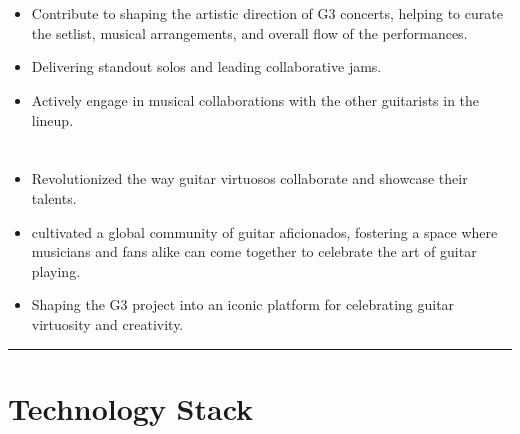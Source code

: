 \documentclass[12pt]{../templates/classes/res}
\begin{document}
\begin{resume}
\begin{multicols}{2}
  \section{}
    \begin{itemize}
      \item Contribute to shaping the artistic direction of G3 concerts, helping to curate the setlist, musical arrangements, and overall flow of the performances. 
\item Delivering standout solos and leading collaborative jams.
\item Actively engage in musical collaborations with the other guitarists in the lineup.
    \end{itemize}
  \section{}
    \begin{itemize}
      \setlength{\itemindent}{0pt}
      \item Revolutionized the way guitar virtuosos collaborate and showcase their talents.
\item cultivated a global community of guitar aficionados, fostering a space where musicians and fans alike can come together to celebrate the art of guitar playing.
\item Shaping the G3 project into an iconic platform for celebrating guitar virtuosity and creativity.
    \end{itemize}
\end{multicols}

\vspace{-20pt}
\begin{minipage}[t]{0.55\linewidth}
  \rule{0.25\textwidth}{2pt}
  \begin{multicols}{2}
    \section{Technology Stack}
    \columnbreak
    \section{}
  \end{multicols}
  \vspace{1pt}
\end{minipage}
\hfill
\begin{minipage}[t]{0.42\linewidth}
  \vspace{18pt}

\end{minipage}
\end{resume}
\end{document}
